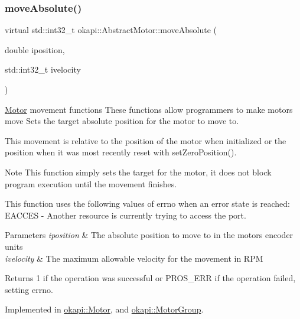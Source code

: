 \mbox{\label{classokapi_1_1AbstractMotor_ab84ff0f3e39fa14dcf74bcc867863ff8}} 
\subsubsection{\texorpdfstring{moveAbsolute()}{moveAbsolute()}}
{\footnotesize\ttfamily virtual std\+::int32\+\_\+t okapi\+::\+Abstract\+Motor\+::move\+Absolute (\begin{DoxyParamCaption}\item[{double}]{iposition,  }\item[{std\+::int32\+\_\+t}]{ivelocity }\end{DoxyParamCaption})\hspace{0.3cm}{\ttfamily [pure virtual]}}

\mbox{\hyperlink{classokapi_1_1Motor}{Motor}} movement functions These functions allow programmers to make motors move Sets the target absolute position for the motor to move to.

This movement is relative to the position of the motor when initialized or the position when it was most recently reset with set\+Zero\+Position().

\begin{DoxyNote}{Note}
This function simply sets the target for the motor, it does not block program execution until the movement finishes.
\end{DoxyNote}
This function uses the following values of errno when an error state is reached\+: E\+A\+C\+C\+ES -\/ Another resource is currently trying to access the port.


\begin{DoxyParams}{Parameters}
{\em iposition} & The absolute position to move to in the motor\textquotesingle{}s encoder units \\
\hline
{\em ivelocity} & The maximum allowable velocity for the movement in R\+PM \\
\hline
\end{DoxyParams}
\begin{DoxyReturn}{Returns}
1 if the operation was successful or P\+R\+O\+S\+\_\+\+E\+RR if the operation failed, setting errno. 
\end{DoxyReturn}


Implemented in \mbox{\hyperlink{classokapi_1_1Motor_a5f95fd5864805b57f16fa5defdbf1968}{okapi\+::\+Motor}}, and \mbox{\hyperlink{classokapi_1_1MotorGroup_afe6800639a995d37d8963c72fb8526d4}{okapi\+::\+Motor\+Group}}.

